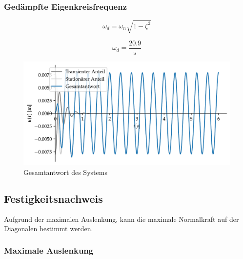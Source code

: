 \documentclass[
  letterpaper,
  DIV=11]{scrreprt}
\begin{document}
\hypertarget{geduxe4mpfte-eigenkreisfrequenz}{%
\subsubsection{Gedämpfte
Eigenkreisfrequenz}\label{geduxe4mpfte-eigenkreisfrequenz}}

\begin{equation}\omega_{d} = \omega_{n} \sqrt{1 - \zeta_{}^{2}}\end{equation}

\begin{equation}\omega_{d} = \frac{20.9}{\text{s}}\end{equation}

\begin{figure}[H]

{\centering \includegraphics{index_files/mediabag/ems_05_files/figure-pdf/fig-ems_dampf_gesamtantwort_ems5-output-1.pdf}

}

\caption{\label{fig-ems_dampf_gesamtantwort_ems5}Gesamtantwort des
Systems}

\end{figure}

\hypertarget{festigkeitsnachweis-1}{%
\subsection{Festigkeitsnachweis}\label{festigkeitsnachweis-1}}

Aufgrund der maximalen Auslenkung, kann die maximale Normalkraft auf der
Diagonalen bestimmt werden.

\hypertarget{maximale-auslenkung-1}{%
\subsubsection{Maximale Auslenkung}\label{maximale-auslenkung-1}}
\end{document}
